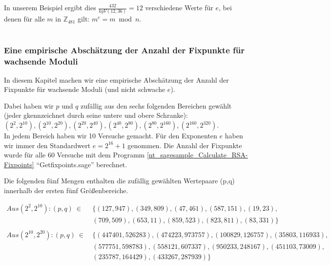 \begin{refsegment}
 In unserem Beispiel ergibt dies $\frac{432}{kgV(12,36)}=12 $ verschiedene Werte
für $e$, bei denen für alle $m$ in $\mathbb{Z}_{481}$ gilt: $m^e = m \bmod n$.\\
~\\ %



\subsubsection[Empirische Abschätzung der Anzahl der Fixpunkte für wachsende Moduli]
              {Eine empirische Abschätzung der Anzahl der Fixpunkte für wachsende Moduli}
In diesem Kapitel machen wir eine empirische Abschätzung der Anzahl der Fixpunkte
für wachsende Moduli (und nicht schwache $e$).

 Dabei haben wir $p $ und $ q$ zufällig aus den sechs folgenden Bereichen
gewählt (jeder gkennzeichnet durch seine untere und obere Schranke):\\
$(2^2, 2^{10}), (2^{10}, 2^{20}), (2^{20}, 2^{40}), (2^{40}, 2^{80}),
 (2^{80}, 2^{160}), (2^{160}, 2^{320})$.\\
In jedem Bereich haben wir 10 Versuche gemacht. Für den Exponenten $e$ haben wir
immer den Standardwert $e=2^{16}+1$ genommen. Die Anzahl der Fixpunkte wurde für
alle 60 Versuche mit dem Programm
\ref{nt_sagesample_Calculate_RSA-Fixpoints} "`Getfixpoints.sage"' berechnet.

 Die folgenden fünf Mengen enthalten die zufällig gewählten Wertepaare (p,q) innerhalb
der ersten fünf Größenbereiche.

\begin{equation*}
  \begin{split}
Aus (2^2, 2^{10}): (p,q)~\in~ & \{ (127,947),(349,809),(47,461),(587,151),(19,23),\\
                              & (709,509),(653,11),(859,523),(823,811),(83,331)\}\\
\\
Aus (2^{10}, 2^{20}): (p,q)~\in~
            & \{ (447401,526283),(474223,973757),(100829,126757),(35803,116933),\\
            &    (577751,598783),(558121,607337),(950233,248167),(451103,73009),\\
            &    (235787,164429),(433267,287939)\}\\
  \end{split}
\end{equation*}


\end{refsegment}

